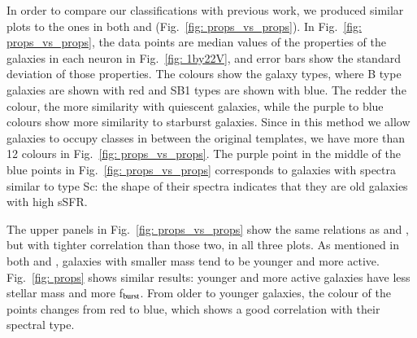         In order to compare our classifications with previous work, we produced similar plots to the ones in both  and  (Fig.~\ref{fig: props_vs_props}).
        In Fig.~\ref{fig: props_vs_props}, the data points are median values of the properties of the galaxies in each neuron in Fig.~\ref{fig: 1by22V}, and error bars show the standard deviation of those properties.
        The colours show the galaxy types, where B type galaxies are shown with red and SB1 types are shown with blue.
        The redder the colour, the more similarity with quiescent galaxies, while the purple to blue colours show more similarity to starburst galaxies.
        Since in this method we allow galaxies to occupy classes in between the original  templates, we have more than 12 colours in Fig.~\ref{fig: props_vs_props}.
        The purple point in the middle of the blue points in Fig.~\ref{fig: props_vs_props} corresponds to galaxies with spectra similar to type Sc: the shape of their spectra indicates that they are old galaxies with high sSFR.
        
        The upper panels in Fig.~\ref{fig: props_vs_props} show the same relations as  and , but with tighter correlation than those two, in all three plots.
        As mentioned in both  and , galaxies with smaller mass tend to be younger and more active.
        Fig.~\ref{fig: props} shows similar results: younger and more active galaxies have less stellar mass and more f$_{\rm {burst}}$.
        From older to younger galaxies, the colour of the points changes from red to blue, which shows a good correlation with their spectral type.
        
